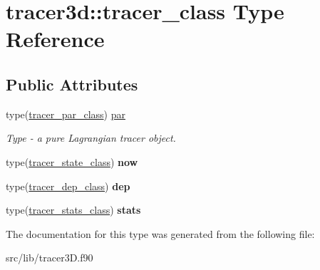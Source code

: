 \hypertarget{structtracer3d_1_1tracer__class}{}\section{tracer3d\+:\+:tracer\+\_\+class Type Reference}
\label{structtracer3d_1_1tracer__class}
\subsection*{Public Attributes}
\begin{DoxyCompactItemize}
\item 
\mbox{\label{structtracer3d_1_1tracer__class_a3745c68bd31158518852af7839b5d25d}} 
type(\mbox{\hyperlink{structtracer3d_1_1tracer__par__class}{tracer\+\_\+par\+\_\+class}}) \mbox{\hyperlink{structtracer3d_1_1tracer__class_a3745c68bd31158518852af7839b5d25d}{par}}
\begin{DoxyCompactList}\small\item\em Type -\/ a pure Lagrangian tracer object. \end{DoxyCompactList}\item 
\mbox{\label{structtracer3d_1_1tracer__class_a9078a3dd8dfd7a789277f35549d31ff6}} 
type(\mbox{\hyperlink{structtracer3d_1_1tracer__state__class}{tracer\+\_\+state\+\_\+class}}) {\bfseries now}
\item 
\mbox{\label{structtracer3d_1_1tracer__class_a57b8dd8bcb6075c243a4a6fb5bbb6bf8}} 
type(\mbox{\hyperlink{structtracer3d_1_1tracer__dep__class}{tracer\+\_\+dep\+\_\+class}}) {\bfseries dep}
\item 
\mbox{\label{structtracer3d_1_1tracer__class_a7145b520dad5b862da8b0fc14da0a8f0}} 
type(\mbox{\hyperlink{structtracer3d_1_1tracer__stats__class}{tracer\+\_\+stats\+\_\+class}}) {\bfseries stats}
\end{DoxyCompactItemize}


The documentation for this type was generated from the following file\+:\begin{DoxyCompactItemize}
\item 
src/lib/tracer3\+D.\+f90\end{DoxyCompactItemize}
